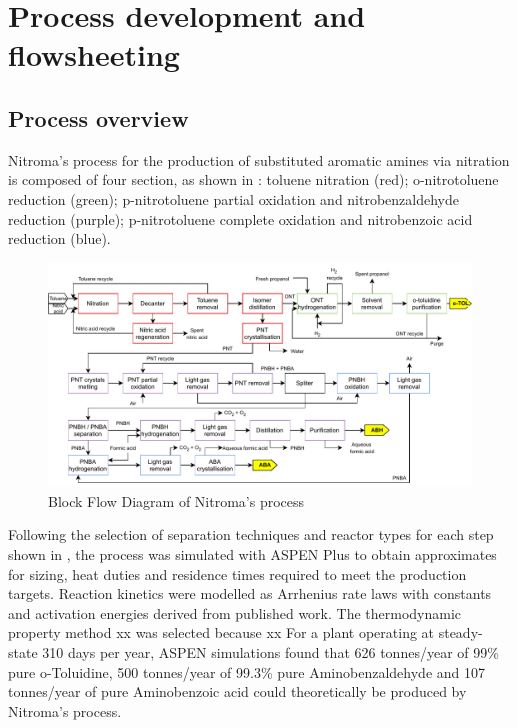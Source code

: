 \section{Process development and flowsheeting}

\subsection{Process overview}

Nitroma's process for the production of substituted aromatic amines via nitration is composed of four section, as shown in : toluene nitration (red); o-nitrotoluene reduction (green); p-nitrotoluene partial oxidation and nitrobenzaldehyde reduction (purple); p-nitrotoluene complete oxidation and nitrobenzoic acid reduction (blue). 


\begin{figure}[H]
    \centering
    \includegraphics[width=\linewidth]{1-Figures/BFD_nitroma.pdf}
    \caption{Block Flow Diagram of Nitroma's process}
    \label{fig:BFD}
\end{figure}

Following the selection of separation techniques and reactor types for each step shown in , the process was simulated with ASPEN Plus to obtain approximates for sizing, heat duties and residence times required to meet the production targets. Reaction kinetics were modelled as Arrhenius rate laws with constants and activation energies derived from published work. The thermodynamic property method xx was selected because xx
For a plant operating at steady-state 310 days per year, ASPEN simulations found that 626 tonnes/year of 99\% pure o-Toluidine, 500 tonnes/year of 99.3\% pure Aminobenzaldehyde and 107 tonnes/year of pure Aminobenzoic acid could theoretically be produced by Nitroma's process.

